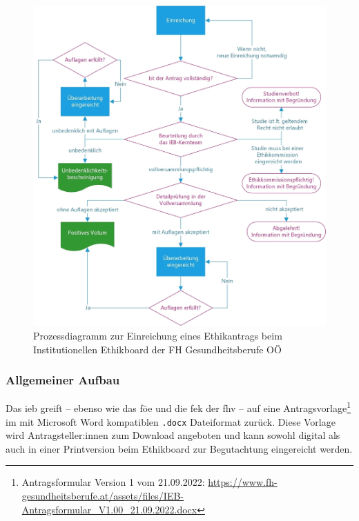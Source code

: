 \documentclass[a4paper,12pt,twoside,numbers=noendperiod]{scrreprt}
\begin{document}
\begin{figure}[ht]
    \centering
    \includegraphics[scale=0.15]{thesis/images/FHGOOE_Prozess-Ethikantrag.jpg}
    \caption[Prozessdiagramm zur Einreichung eines Ethikantrags beim Institutionellen Ethikboard der FH Gesundheitsberufe OÖ]{Prozessdiagramm zur Einreichung eines Ethikantrags beim Institutionellen Ethikboard der FH Gesundheitsberufe OÖ \cite{fh_gesundheitsberufe_oo_gmbh_einreichung_2023}}
    \label{fig:prozess-ethikantrag-ieb}
\end{figure}

\subsubsection*{Allgemeiner Aufbau}
\label{sub-sub-sec:fh-oö-allgemeiner-aufbau}

Das \ac{ieb} greift -- ebenso wie das \ac{föe} und die \ac{fek} der \ac{fhv} -- auf eine Antragsvorlage\footnote{Antragsformular Version 1 vom 21.09.2022: \url{https://www.fh-gesundheitsberufe.at/assets/files/IEB-Antragsformular_V1.00_21.09.2022.docx}} im mit Microsoft Word kompatiblen \texttt{.docx} Dateiformat zurück. Diese Vorlage wird Antragsteller:innen zum Download angeboten und kann sowohl digital als auch in einer Printversion beim Ethikboard zur Begutachtung eingereicht werden. \cite{fh_gesundheitsberufe_oo_gmbh_einreichung_2023}
\end{document}
